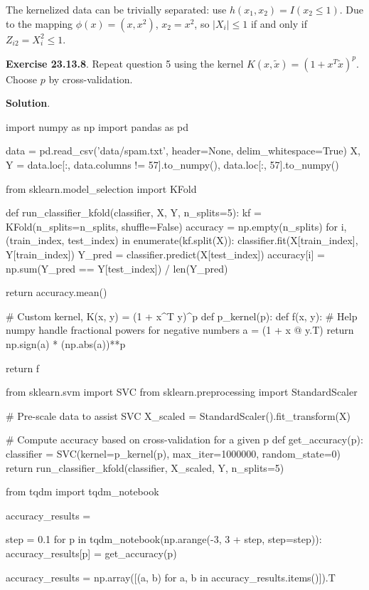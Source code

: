 The kernelized data can be trivially separated: use
\(h(x_1, x_2) = I(x_2 \leq 1)\). Due to the mapping
\(\phi(x) = (x, x^2)\), \(x_2 = x^2\), so \(|X_i| \leq 1\) if and only
if \(Z_{i2} = X_i^2 \leq 1\).

\textbf{Exercise 23.13.8}. Repeat question 5 using the kernel
\(K(x, \tilde{x}) = (1 + x^T\tilde{x})^p\). Choose \(p\) by
cross-validation.

\textbf{Solution}.

\begin{python}
import numpy as np
import pandas as pd

data = pd.read_csv('data/spam.txt', header=None, delim_whitespace=True)
X, Y = data.loc[:, data.columns != 57].to_numpy(), data.loc[:, 57].to_numpy()
\end{python}

\begin{python}
from sklearn.model_selection import KFold

def run_classifier_kfold(classifier, X, Y, n_splits=5):
    kf = KFold(n_splits=n_splits, shuffle=False)
    accuracy = np.empty(n_splits)
    for i, (train_index, test_index) in enumerate(kf.split(X)):
        classifier.fit(X[train_index], Y[train_index])
        Y_pred = classifier.predict(X[test_index])
        accuracy[i] = np.sum(Y_pred == Y[test_index]) / len(Y_pred)
    
    return accuracy.mean()
\end{python}

\begin{python}
# Custom kernel, K(x, y) = (1 + x^T y)^p
def p_kernel(p):
    def f(x, y):
        # Help numpy handle fractional powers for negative numbers
        a = (1 + x @ y.T)
        return np.sign(a) * (np.abs(a))**p
        
    return f
\end{python}

\begin{python}
from sklearn.svm import SVC
from sklearn.preprocessing import StandardScaler

# Pre-scale data to assist SVC
X_scaled = StandardScaler().fit_transform(X)

# Compute accuracy based on cross-validation for a given p
def get_accuracy(p):
    classifier = SVC(kernel=p_kernel(p), max_iter=1000000, random_state=0)
    return run_classifier_kfold(classifier, X_scaled, Y, n_splits=5)
\end{python}

\begin{python}
from tqdm import tqdm_notebook

accuracy_results = {}

step = 0.1
for p in tqdm_notebook(np.arange(-3, 3 + step, step=step)):
    accuracy_results[p] = get_accuracy(p)
    
accuracy_results = np.array([(a, b) for a, b in accuracy_results.items()]).T
\end{python}

